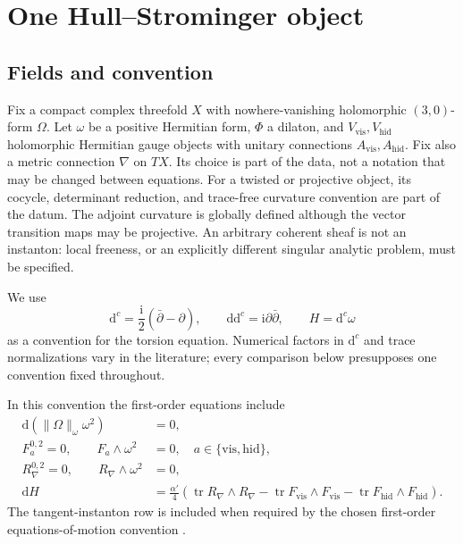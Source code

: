 \documentclass[11pt]{article}
\theoremstyle{definition}
\theoremstyle{remark}
\newcommand{\dd}{\mathrm d}
\newcommand{\ii}{\mathrm i}
\newcommand{\tr}{\operatorname{tr}}
\begin{document}
\section{One Hull--Strominger object}
\label{sec:hs}

\subsection{Fields and convention}

Fix a compact complex threefold \(X\) with nowhere-vanishing holomorphic
\((3,0)\)-form \(\Omega\).  Let \(\omega\) be a positive Hermitian form,
\(\Phi\) a dilaton, and \(V_{\mathrm{vis}},V_{\mathrm{hid}}\) holomorphic
Hermitian gauge objects with unitary connections
\(A_{\mathrm{vis}},A_{\mathrm{hid}}\).  Fix also a metric connection
\(\nabla\) on \(TX\).  Its choice is part of the data, not a notation that may
be changed between equations.
For a twisted or projective object, its cocycle, determinant reduction, and
trace-free curvature convention are part of the datum.  The adjoint curvature
is globally defined although the vector transition maps may be projective.
An arbitrary coherent sheaf is not an instanton: local freeness, or an
explicitly different singular analytic problem, must be specified.

We use
\[
\dd^c=\frac{\ii}{2}(\bar\partial-\partial),\qquad
\dd\dd^c=\ii\partial\bar\partial,\qquad
H=\dd^c\omega
\]
as a convention for the torsion equation.  Numerical factors in \(\dd^c\)
and trace normalizations vary in the literature; every comparison below
presupposes one convention fixed throughout.

In this convention the first-order equations include
\begin{align}
\dd\!\left(\|\Omega\|_\omega\omega^2\right)&=0,
\label{eq:balanced}\\
F_a^{0,2}=0,\qquad F_a\wedge\omega^2&=0,
\quad a\in\{\mathrm{vis},\mathrm{hid}\},
\label{eq:gauge-hym}\\
R_\nabla^{0,2}=0,\qquad R_\nabla\wedge\omega^2&=0,
\label{eq:tangent-instanton}\\
\dd H&=\frac{\alpha'}4\left(
\tr R_\nabla\wedge R_\nabla
-\tr F_{\mathrm{vis}}\wedge F_{\mathrm{vis}}
-\tr F_{\mathrm{hid}}\wedge F_{\mathrm{hid}}\right).
\label{eq:bianchi}
\end{align}
The tangent-instanton row is included when required by the chosen
first-order equations-of-motion convention
\cite{Strominger1986,Hull1986,DelaOssaSvanes2014}.
\end{document}
